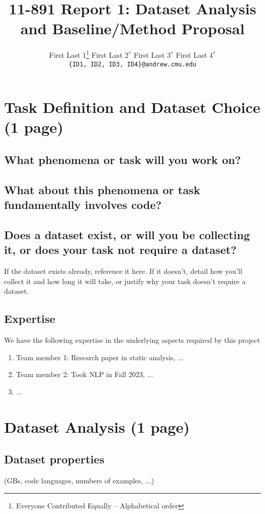 \documentclass[11pt,a4paper]{article}
\title{11-891 Report 1: Dataset Analysis and Baseline/Method Proposal}
\author{
  First Last 1\thanks{\hspace{4pt}Everyone Contributed Equally -- Alphabetical order} \hspace{2em} First Last 2$^*$ \hspace{2em} First Last 3$^*$ \hspace{2em} First Last 4$^*$ \\
  \texttt{\{ID1, ID2, ID3, ID4\}@andrew.cmu.edu}
  }
\date{}
\begin{document}
\maketitle

\section{Task Definition and Dataset Choice (1 page)}

\subsection{What phenomena or task will you work on?}

\subsection{What about this phenomena or task fundamentally involves code?}

\subsection{Does a dataset exist, or will you be collecting it, or does your task not require a dataset?}
If the dataset exists already, reference it here. If it doesn't, detail how you'll collect it and how long it will take, or justify why your task doesn't require a dataset.

\subsection{Expertise}
We have the following expertise in the underlying aspects required by this project
  \begin{enumerate}
      \item Team member 1: Research paper in static analysis, ...
      \item Team member 2: Took NLP in Fall 2023, ...
      \item ...
  \end{enumerate}

\clearpage
\section{Dataset Analysis (1 page)}
\subsection{Dataset properties} (GBs, code languages, numbers of examples, ...)
\end{document}

